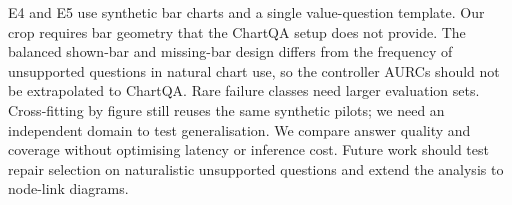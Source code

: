 E4 and E5 use synthetic bar charts and a single value-question template.
Our crop requires bar geometry that the ChartQA setup does not provide. The
balanced shown-bar and missing-bar design differs from the frequency of
unsupported questions in natural chart use, so the controller AURCs should
not be extrapolated to ChartQA. Rare failure classes need larger evaluation
sets. Cross-fitting by figure still reuses the same synthetic pilots; we need
an independent domain to test generalisation. We compare answer quality and
coverage without optimising latency or inference cost. Future work should
test repair selection on naturalistic unsupported questions and extend the
analysis to node-link diagrams.
